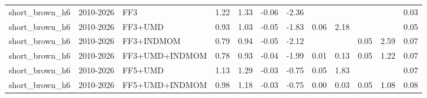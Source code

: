\begin{tabular}{llllllllllll}
short\_brown\_h6 & 2010-2026 & FF3 & 1.22 & 1.33 & -0.06 & -2.36 &  &  &  &  & 0.03 \\
short\_brown\_h6 & 2010-2026 & FF3+UMD & 0.93 & 1.03 & -0.05 & -1.83 & 0.06 & 2.18 &  &  & 0.05 \\
short\_brown\_h6 & 2010-2026 & FF3+INDMOM & 0.79 & 0.94 & -0.05 & -2.12 &  &  & 0.05 & 2.59 & 0.07 \\
short\_brown\_h6 & 2010-2026 & FF3+UMD+INDMOM & 0.78 & 0.93 & -0.04 & -1.99 & 0.01 & 0.13 & 0.05 & 1.22 & 0.07 \\
short\_brown\_h6 & 2010-2026 & FF5+UMD & 1.13 & 1.29 & -0.03 & -0.75 & 0.05 & 1.83 &  &  & 0.07 \\
short\_brown\_h6 & 2010-2026 & FF5+UMD+INDMOM & 0.98 & 1.18 & -0.03 & -0.75 & 0.00 & 0.03 & 0.05 & 1.08 & 0.08 \\
\bottomrule
\end{tabular}
